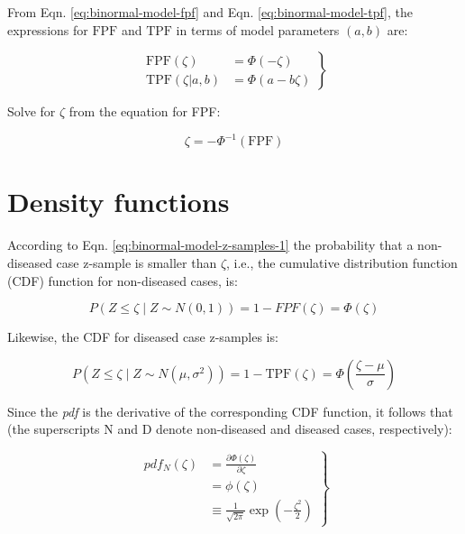 \documentclass[
]{book}
\begin{document}
From Eqn. \eqref{eq:binormal-model-fpf} and Eqn. \eqref{eq:binormal-model-tpf}, the expressions for \(\text{FPF}\) and \(\text{TPF}\) in terms of model parameters \((a,b)\) are:

\begin{equation}
\left.
\begin{aligned}
\text{FPF}\left ( \zeta \right ) &= \Phi\left ( -\zeta \right )\\
\text{TPF}\left (\zeta | a,b \right ) &= \Phi\left ( a - b \zeta \right )
\end{aligned}
\right \}
\label{eq:binormal-model-op-point-ab}
\end{equation}

Solve for \(\zeta\) from the equation for FPF:

\begin{equation}
\zeta = - \Phi^{-1}\left ( \text{FPF} \right )
\label{eq:binormal-model-op-point-ab1}
\end{equation}

\hypertarget{binormal-model-pdfs}{%
\section{Density functions}\label{binormal-model-pdfs}}

According to Eqn. \eqref{eq:binormal-model-z-samples-1} the probability that a non-diseased case z-sample is smaller than \(\zeta\), i.e., the cumulative distribution function (CDF) function for non-diseased cases, is:

\begin{equation*} 
P\left ( Z \le \zeta \mid  Z\sim N\left ( 0,1 \right ) \right ) = 1-FPF\left ( \zeta \right ) = \Phi \left ( \zeta  \right )
\end{equation*}

Likewise, the CDF for diseased case z-samples is:

\begin{equation*} 
P\left ( Z \le \zeta \mid  Z\sim N\left ( \mu,\sigma^2 \right ) \right ) = 1-\text{TPF}\left ( \zeta \right ) = \Phi \left ( \frac{\zeta - \mu}{\sigma}  \right )
\end{equation*}

Since the \emph{pdf} is the derivative of the corresponding CDF function, it follows that (the superscripts N and D denote non-diseased and diseased cases, respectively):

\begin{equation} 
\left.
\begin{aligned}
pdf_N\left ( \zeta \right ) &= \frac{\partial \Phi\left ( \zeta \right )}{\partial \zeta} \\
&= \phi\left ( \zeta \right ) \\
&\equiv \frac{1}{\sqrt{2 \pi}}\exp\left ( -\frac{\zeta^2}{2} \right )
\end{aligned}
\right \}
\label{eq:binormal-model-pdf-n}
\end{equation}
\end{document}
